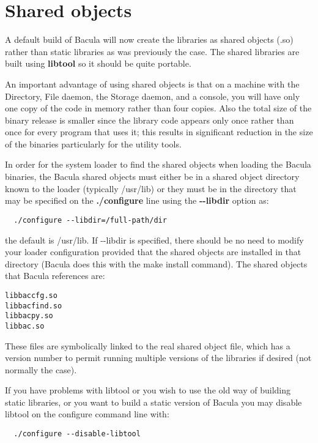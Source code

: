 \section{Shared objects}
A default build of Bacula will now create the libraries as shared objects
(.so) rather than static libraries as was previously the case.  
The shared libraries are built using {\bf libtool} so it should be quite
portable.

An important advantage of using shared objects is that on a machine with the
Directory, File daemon, the Storage daemon, and a console, you will have only
one copy of the code in memory rather than four copies.  Also the total size of
the binary release is smaller since the library code appears only once rather
than once for every program that uses it; this results in significant reduction
in the size of the binaries particularly for the utility tools.
 
In order for the system loader to find the shared objects when loading the
Bacula binaries, the Bacula shared objects must either be in a shared object
directory known to the loader (typically /usr/lib) or they must be in the
directory that may be specified on the {\bf ./configure} line using the {\bf
  {-}{-}libdir} option as:

\begin{verbatim}
  ./configure --libdir=/full-path/dir
\end{verbatim}

the default is /usr/lib. If {-}{-}libdir is specified, there should be
no need to modify your loader configuration provided that
the shared objects are installed in that directory (Bacula
does this with the make install command). The shared objects
that Bacula references are:

\begin{verbatim}
libbaccfg.so
libbacfind.so
libbacpy.so
libbac.so
\end{verbatim}

These files are symbolically linked to the real shared object file,
which has a version number to permit running multiple versions of
the libraries if desired (not normally the case).

If you have problems with libtool or you wish to use the old
way of building static libraries, or you want to build a static
version of Bacula you may disable
libtool on the configure command line with:

\begin{verbatim}
  ./configure --disable-libtool
\end{verbatim}


